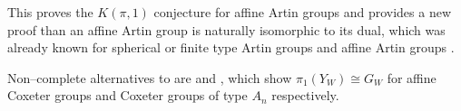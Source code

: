 \documentclass[class=guthesis, crop=false]{standalone}
\begin{document}
This proves the $K(\pi, 1)$ conjecture for affine Artin groups and provides a new proof than an affine Artin group is naturally isomorphic to its dual, which was already known for spherical or finite type Artin groups \cite{bessis_dual_2003} and affine Artin groups \cite{mccammond_sulway_artin_2017}.

Non--complete alternatives to \cite{brieskorn_fundamentalgruppe_1971} are \cite{vietdung_fundamental_1983} and \cite{fox_neuwirth_braid_1962}, which show $\pi_1(Y_W) \cong G_W$ for affine Coxeter groups and Coxeter groups of type $A_n$ respectively.
\end{document}
